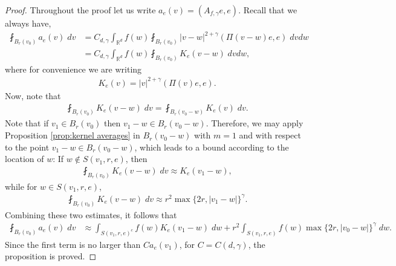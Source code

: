 \documentclass[12pt,american]{amsart}
\numberwithin{equation}{section}
\theoremstyle{plain}
\theoremstyle{definition}                  %
\begin{document}
\begin{proof}
  Throughout the proof let us write $a_e(v)=(A_{f,\gamma}e,e)$. Recall that we always have,
  \begin{align*}
    \fint_{B_r(v_0)}a_e(v)\;dv  & = C_{d,\gamma}\int_{\mathbb{R}^d}f(w)\fint_{B_r(v_0)}|v-w|^{2+\gamma}(\Pi(v-w)e,e)\;dvdw\\
	  & = C_{d,\gamma}\int_{\mathbb{R}^d}f(w)\fint_{B_r(v_0)}K_e(v-w)\;dvdw,
  \end{align*}
  where for convenience we are writing
  \begin{align*}
    K_e(v) = |v|^{2+\gamma}(\Pi(v)e,e).	  
  \end{align*}	
  Now, note that
  \begin{align*}
    \fint_{B_r(v_0)}K_e(v-w)\;dv = \fint_{B_r(v_0-w)}K_e(v)\;dv. 
  \end{align*}    
  Note that if $v_1 \in B_r(v_0)$ then $v_1-w\in B_r(v_0-w)$. Therefore, we may apply Proposition \ref{prop:kernel averages} in $B_r(v_0-w)$ with $m=1$ and with respect to the point $v_1-w\in B_r(v_0-w)$, which leads to a bound according to the location of $w$: If $w\not\in S(v_1,r,e)$, then 
  \begin{align*}
    \fint_{B_r(v_0)}K_e(v-w)\;dv \approx K_e(v_1-w),
  \end{align*}
  while for $w \in S(v_1,r,e)$,
  \begin{align*}
    \fint_{B_r(v_0)}K_e(v-w)\;dv \approx r^{2}\max \{2r,|v_1-w|\}^{\gamma}.
  \end{align*}
  Combining these two estimates, it follows that 
  \begin{align*}
    \fint_{B_r(v_0)}a_e(v)\;dv  & \approx \int_{S(v_1,r,e)^c}f(w)K_e(v_1-w)\;dw+r^2\int_{S(v_1,r,e)}f(w)\max \{2r,|v_0-w|\}^{\gamma}\;dw.
  \end{align*}  
  Since the first term is no larger than $Ca_e(v_1)$, for $C=C(d,\gamma)$, the proposition is proved.
\end{proof}



\end{document}
